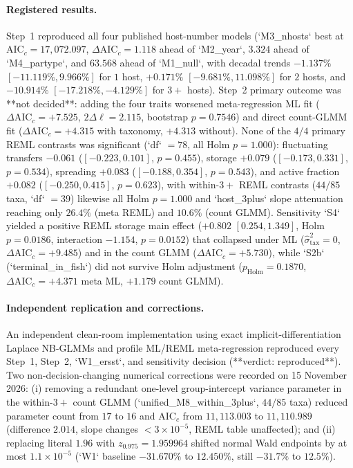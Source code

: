 \paragraph{Registered results.}
Step~1 reproduced all four published host-number models (`M3\_nhosts` best at $\mathrm{AIC}_c = 17{,}072.097$, $\Delta\mathrm{AIC}_c = 1.118$ ahead of `M2\_year`, $3.324$ ahead of `M4\_partype`, and $63.568$ ahead of `M1\_null`, with decadal trends $-1.137\%$ $[-11.119\%, 9.966\%]$ for $1$ host, $+0.171\%$ $[-9.681\%, 11.098\%]$ for $2$ hosts, and $-10.914\%$ $[-17.218\%, -4.129\%]$ for $3+$ hosts). Step~2 primary outcome was **not decided**: adding the four traits worsened meta-regression ML fit ($\Delta\mathrm{AIC}_c = +7.525$, $2\Delta\ell = 2.115$, bootstrap $p = 0.7546$) and direct count-GLMM fit ($\Delta\mathrm{AIC}_c = +4.315$ with taxonomy, $+4.313$ without). None of the $4/4$ primary REML contrasts was significant (`df` $= 78$, all Holm $p = 1.000$): fluctuating transfers $-0.061$ ($[-0.223, 0.101]$, $p = 0.455$), storage $+0.079$ ($[-0.173, 0.331]$, $p = 0.534$), spreading $+0.083$ ($[-0.188, 0.354]$, $p = 0.543$), and active fraction $+0.082$ ($[-0.250, 0.415]$, $p = 0.623$), with within-$3+$ REML contrasts ($44/85$ taxa, `df` $= 39$) likewise all Holm $p = 1.000$ and `host\_3plus` slope attenuation reaching only $26.4\%$ (meta REML) and $10.6\%$ (count GLMM). Sensitivity `S4` yielded a positive REML storage main effect ($+0.802$ $[0.254, 1.349]$, Holm $p = 0.0186$, interaction $-1.154$, $p = 0.0152$) that collapsed under ML ($\hat{\sigma}_{\mathrm{tax}}^2 = 0$, $\Delta\mathrm{AIC}_c = +9.485$) and in the count GLMM ($\Delta\mathrm{AIC}_c = +5.730$), while `S2b` (`terminal\_in\_fish`) did not survive Holm adjustment ($p_{\mathrm{Holm}} = 0.1870$, $\Delta\mathrm{AIC}_c = +4.371$ meta ML, $+1.179$ count GLMM).

\paragraph{Independent replication and corrections.}
An independent clean-room implementation using exact implicit-differentiation Laplace NB-GLMMs and profile ML/REML meta-regression reproduced every Step~1, Step~2, `W1\_ersst`, and sensitivity decision (**verdict: reproduced**). Two non-decision-changing numerical corrections were recorded on 15 November 2026: (i) removing a redundant one-level group-intercept variance parameter in the within-$3+$ count GLMM (`unified\_M8\_within\_3plus`, $44/85$ taxa) reduced parameter count from $17$ to $16$ and $\mathrm{AIC}_c$ from $11{,}113.003$ to $11{,}110.989$ (difference $2.014$, slope changes $< 3 \times 10^{-5}$, REML table unaffected); and (ii) replacing literal $1.96$ with $z_{0.975} = 1.959964$ shifted normal Wald endpoints by at most $1.1 \times 10^{-5}$ (`W1` baseline $-31.670\%$ to $12.450\%$, still $-31.7\%$ to $12.5\%$).

